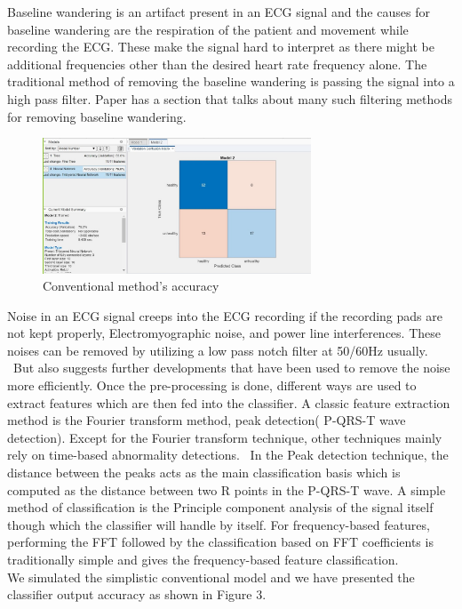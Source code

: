 \documentclass[10pt,twocolumn,letterpaper]{article}
\begin{document}
Baseline wandering is an artifact present in an ECG signal and the causes for baseline wandering are the respiration of the patient and movement while recording the ECG. These make the signal hard to interpret as there might be additional frequencies other than the desired heart rate frequency alone. The traditional method of removing the baseline wandering is passing the signal into a high pass filter\cite{Alpher05}. Paper has a section that talks about many such filtering methods for removing baseline wandering.\\
\begin{figure}[htbp]
\includegraphics[width=8cm]{ConventionalResult.jpg}
\caption{Conventional method's accuracy}
\label{Classification using conventional approach}
\end{figure}
Noise in an ECG signal creeps into the ECG recording if the recording pads are not kept properly, Electromyographic noise, and power line interferences. These noises can be removed by utilizing a low pass notch filter at 50/60Hz usually.  But \cite{Alpher05} also suggests further developments that have been used to remove the noise more efficiently.
Once the pre-processing is done, different ways are used to extract features which are then fed into the classifier. A classic feature extraction method is the Fourier transform method, peak detection( P-QRS-T wave detection). Except for the Fourier transform technique, other techniques mainly rely on time-based abnormality detections.  In the Peak detection technique, the distance between the peaks acts as the main classification basis which is computed as the distance between two R points in the P-QRS-T wave. A simple method of classification is the Principle component analysis of the signal itself though which the classifier will handle by itself. For frequency-based features, performing the FFT followed by the classification based on FFT coefficients is traditionally simple and gives the frequency-based feature classification.\\
We simulated the simplistic conventional model and we have presented the classifier output accuracy as shown in Figure 3.
\end{document}
